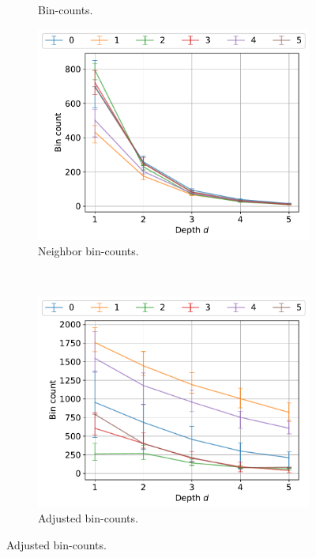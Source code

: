 \documentclass[11pt,onecolumn]{article}
\begin{document}
\begin{figure}[ht!]
\begin{subfigure}[t]{0.3\textwidth}
				\caption{Bin-counts.}
		\end{subfigure}
		\hfill
    \begin{subfigure}[t]{0.3\textwidth}
        \centering
        \includegraphics[width=\linewidth]{fig/chains_type_neighborbincounts_k50c50d5.pdf}
        \caption{Neighbor bin-counts.}
    \end{subfigure}\\
    \begin{subfigure}[t]{0.3\textwidth}
        \centering
        \includegraphics[width=\linewidth]{fig/chains_type_adjustedbincounts_k50c50d5.pdf}
        \caption{Adjusted bin-counts.}
    \end{subfigure}

\end{figure}
\end{document}
